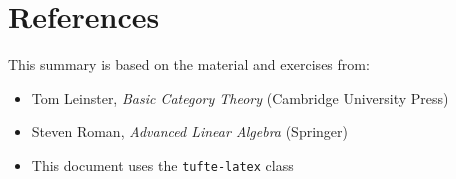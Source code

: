 \documentclass[10pt]{tufte-handout}
\begin{document}
\begin{center}
\end{center}

\section*{References}
This summary is based on the material and exercises from:
\begin{itemize}
    \item Tom Leinster, \textit{Basic Category Theory} (Cambridge University Press)
    \item Steven Roman, \textit{Advanced Linear Algebra} (Springer)
    \item This document uses the \texttt{tufte-latex} class

\end{itemize}
\end{document}
